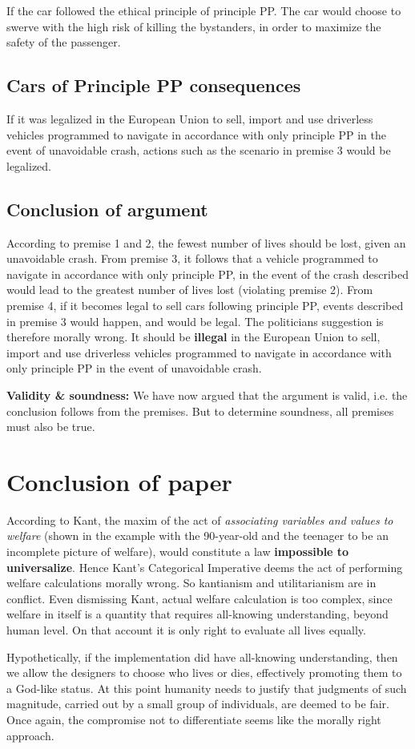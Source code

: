 If the car followed the ethical principle of principle PP. The car would choose to swerve with the high risk of killing the bystanders, in order to maximize the safety of the passenger.

\subsection{Cars of Principle PP consequences}
If it was legalized in the European Union to sell, import and use driverless vehicles programmed to navigate in accordance with only principle PP in the event of unavoidable crash, actions such as the scenario in premise 3 would be legalized. 


\subsection{Conclusion of argument}
According to premise 1 and 2, the fewest number of lives should be lost, given an unavoidable crash.
From premise 3, it follows that a vehicle programmed to navigate in accordance with only principle PP, in the event of the crash described would lead to the greatest number of lives lost (violating premise 2). From premise 4, if it becomes legal to sell cars following principle PP, events described in premise 3 would happen, and would be legal.
The politicians suggestion is therefore morally wrong.
It should be \textbf{illegal} in the European Union to sell, import and use driverless vehicles programmed to navigate in accordance with only principle PP in the event of unavoidable crash. 

\textbf{Validity \& soundness:} We have now argued that the argument is valid, i.e. the conclusion follows from the premises. But to determine soundness, all premises must also be true. 

\section{Conclusion of paper}
According to Kant, the maxim of the act of \textit{associating variables and values to welfare} 
(shown in the example with the 90-year-old and the teenager to be an incomplete picture of welfare), would constitute a law \textbf{impossible to universalize}. Hence Kant's Categorical Imperative deems the act of performing welfare calculations morally wrong. So kantianism and utilitarianism are in conflict. Even dismissing Kant, actual welfare calculation is too complex, since welfare in itself is a quantity that requires all-knowing understanding, beyond human level.
On that account it is only right to evaluate all lives equally.

Hypothetically, if the implementation did have all-knowing understanding, then we
allow the designers to choose who lives or dies, effectively promoting them to a God-like status. At this point humanity needs to justify that judgments of such magnitude,
carried out by a small group of individuals, are deemed to be fair.
Once again, the compromise not to differentiate seems like the morally right approach.


